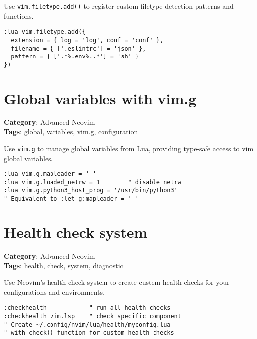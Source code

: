 Use {\footnotesize \Verb§vim.filetype.add()§} to register custom filetype detection patterns and functions.

\begin{Exa*}{}
\begin{Verbatim}[fontsize=\footnotesize, breaklines, breakanywhere]
:lua vim.filetype.add({
  extension = { log = 'log', conf = 'conf' },
  filename = { ['.eslintrc'] = 'json' },
  pattern = { ['.*%.env%..*'] = 'sh' }
})
\end{Verbatim}
\end{Exa*}

\section{Global variables with vim.g}

\textbf{Category}: Advanced Neovim\\ \textbf{Tags}: global, variables, vim.g, configuration
\vspace{0.5cm}

Use {\footnotesize \Verb§vim.g§} to manage global variables from Lua, providing type-safe access to vim global variables.

\begin{Exa*}{}
\begin{Verbatim}[fontsize=\footnotesize, breaklines, breakanywhere]
:lua vim.g.mapleader = ' '
:lua vim.g.loaded_netrw = 1        " disable netrw
:lua vim.g.python3_host_prog = '/usr/bin/python3'
" Equivalent to :let g:mapleader = ' '
\end{Verbatim}
\end{Exa*}

\section{Health check system}

\textbf{Category}: Advanced Neovim\\ \textbf{Tags}: health, check, system, diagnostic
\vspace{0.5cm}

Use Neovim's health check system to create custom health checks for your configurations and environments.

\begin{Exa*}{}
\begin{Verbatim}[fontsize=\footnotesize, breaklines, breakanywhere]
:checkhealth            " run all health checks
:checkhealth vim.lsp    " check specific component
" Create ~/.config/nvim/lua/health/myconfig.lua
" with check() function for custom health checks
\end{Verbatim}
\end{Exa*}

